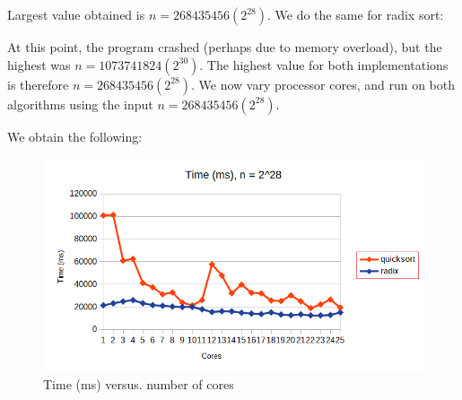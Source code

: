 \documentclass[a4paper]{article}
\begin{document}
Largest value obtained is $n = 268435456  (2^{28})$. We do the same for radix sort:

    
At this point, the program crashed (perhaps due to memory overload), but the highest was $n =  1073741824 (2^{30})$. The highest value for both implementations is therefore $n = 268435456  (2^{28})$.
We now vary processor cores, and run on both algorithms using the input $n = 268435456  (2^{28})$.

We obtain the following: 

    \begin{figure}[H]
    \centering
    \includegraphics{graph2.png}
    \centering
    \caption{Time (ms) versus. number of cores}
\end{figure} 
\end{document}
